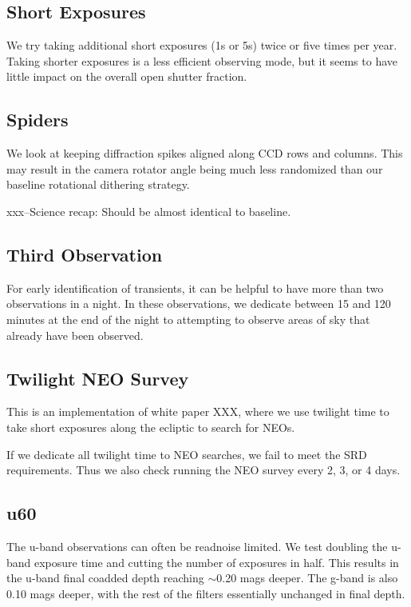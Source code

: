 
\subsection{Short Exposures}

We try taking additional short exposures (1s or 5s) twice or five times per year. Taking shorter exposures is a less efficient observing mode, but it seems to have little impact on the overall open shutter fraction.

\subsection{Spiders}

We look at keeping diffraction spikes aligned along CCD rows and columns. This may result in the camera rotator angle being much less randomized than our baseline rotational dithering strategy.

xxx--Science recap: Should be almost identical to baseline. 

\subsection{Third Observation}

For early identification of transients, it can be helpful to have more than two observations in a night. In these observations, we dedicate between 15 and 120 minutes at the end of the night to attempting to observe areas of sky that already have been observed.

\subsection{Twilight NEO Survey}

This is an implementation of white paper XXX, where we use twilight time to take short exposures along the ecliptic to search for NEOs. 

If we dedicate all twilight time to NEO searches, we fail to meet the SRD requirements. Thus we also check running the NEO survey every 2, 3, or 4 days.

\subsection{u60}\label{ss:u60}
The u-band observations can often be readnoise limited. We test doubling the u-band exposure time and cutting the number of exposures in half. This results in the u-band final coadded depth reaching $\sim$0.20 mags deeper. The g-band is also 0.10 mags deeper, with the rest of the filters essentially unchanged in final depth.

